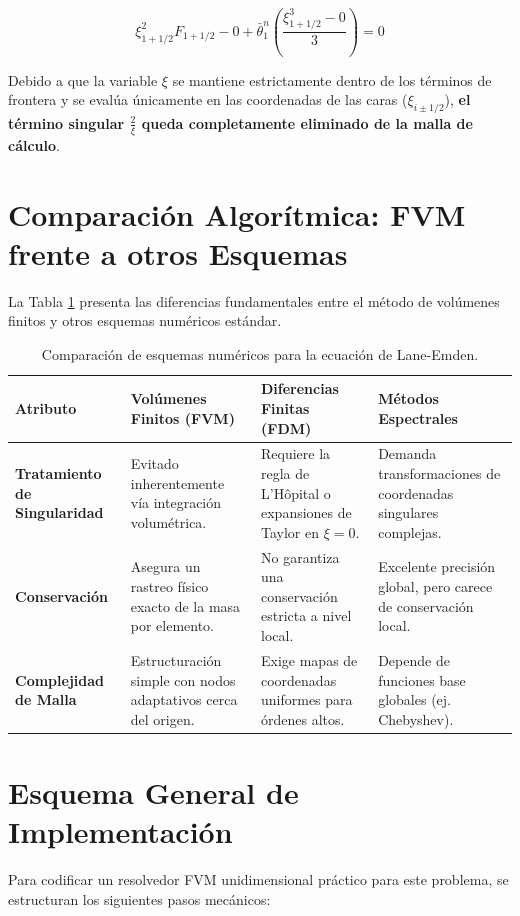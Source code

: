 \documentclass[11pt, lettersize]{article}
\begin{document}
	\begin{equation}
		\xi_{1+1/2}^2 F_{1+1/2} - 0 + \bar{\theta}_1^n \left( \frac{\xi_{1+1/2}^3 - 0}{3} \right) = 0
	\end{equation}
	
	Debido a que la variable $\xi$ se mantiene estrictamente dentro de los términos de frontera y se evalúa únicamente en las coordenadas de las caras ($\xi_{i \pm 1/2}$), \textbf{el término singular $\frac{2}{\xi}$ queda completamente eliminado de la malla de cálculo}.
	
	\section{Comparación Algorítmica: FVM frente a otros Esquemas}
	La Tabla \ref{tab:comparacion} presenta las diferencias fundamentales entre el método de volúmenes finitos y otros esquemas numéricos estándar.
	
	\begin{table}[htbp]
		\centering
		\caption{Comparación de esquemas numéricos para la ecuación de Lane-Emden.}
		\label{tab:comparacion}
		\vspace{0.5em}
		\begin{tabular}{lp{4cm}p{4cm}p{4cm}}
			\toprule
			\textbf{Atributo} & \textbf{Volúmenes Finitos (FVM)} & \textbf{Diferencias Finitas (FDM)} & \textbf{Métodos Espectrales} \\
			\midrule
			\textbf{Tratamiento de Singularidad} & Evitado inherentemente vía integración volumétrica. & Requiere la regla de L'Hôpital o expansiones de Taylor en $\xi = 0$. & Demanda transformaciones de coordenadas singulares complejas. \\
			\addlinespace
			\textbf{Conservación} & Asegura un rastreo físico exacto de la masa por elemento. & No garantiza una conservación estricta a nivel local. & Excelente precisión global, pero carece de conservación local. \\
			\addlinespace
			\textbf{Complejidad de Malla} & Estructuración simple con nodos adaptativos cerca del origen. & Exige mapas de coordenadas uniformes para órdenes altos. & Depende de funciones base globales (ej. Chebyshev). \\
			\bottomrule
		\end{tabular}
	\end{table}
	
	\section{Esquema General de Implementación}
	Para codificar un resolvedor FVM unidimensional práctico para este problema, se estructuran los siguientes pasos mecánicos:
	
\end{document}
